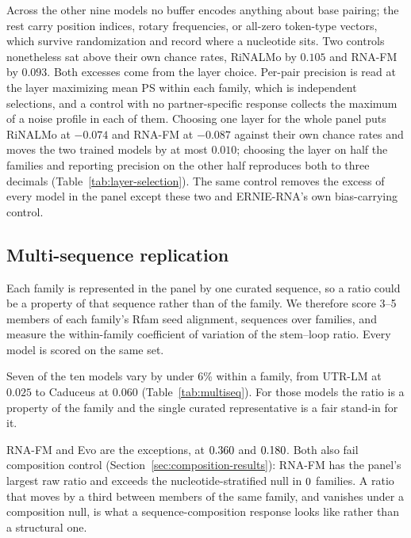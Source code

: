 \documentclass[11pt]{article}
\begin{document}
Across the other nine models no buffer encodes anything about base pairing;
the rest carry position indices, rotary frequencies, or all-zero token-type
vectors, which survive randomization and record where a nucleotide sits. Two
controls nonetheless sat above their own chance rates, RiNALMo by $0.105$ and
RNA-FM by $0.093$. Both excesses come from the layer choice. Per-pair precision
is read at the layer maximizing mean PS within each family, which is
\chanceRateN{} independent selections, and a control with no partner-specific
response collects the maximum of a noise profile in each of them. Choosing one
layer for the whole panel puts RiNALMo at $-0.074$ and RNA-FM at $-0.087$
against their own chance rates and moves the two trained models by at most
$0.010$; choosing the layer on half the families and reporting precision on the
other half reproduces both to three decimals
(Table~\ref{tab:layer-selection}). The same control removes the excess of every
model in the panel except these two and ERNIE-RNA's own bias-carrying control.

\subsection{Multi-sequence replication}
\label{sec:multiseq-results}

Each family is represented in the panel by one curated sequence, so a ratio
could be a property of that sequence rather than of the family. We therefore
score 3--5 members of each family's Rfam seed alignment, \multiseqN{} sequences
over \multiseqFamilies{} families, and measure the within-family coefficient of
variation of the stem--loop ratio. Every model is scored on the same set.



Seven of the ten models vary by under 6\% within a family, from UTR-LM at
$0.025$ to Caduceus at $0.060$ (Table~\ref{tab:multiseq}). For those models the
ratio is a property of the family and the single curated representative is a
fair stand-in for it.

RNA-FM and Evo are the exceptions, at $0.360{}$ and $0.180{}$. Both also
fail composition control (Section~\ref{sec:composition-results}): RNA-FM has the
panel's largest raw ratio and exceeds the nucleotide-stratified null in
$0{}$ families. A ratio that moves by a third between members of the
same family, and vanishes under a composition null, is what a
sequence-composition response looks like rather than a structural one.
\end{document}
